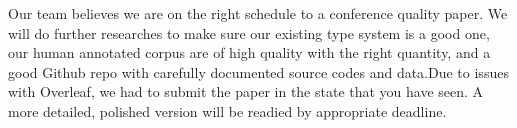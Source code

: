 \documentclass[conference]{IEEEtran}
\begin{document}
Our team believes we are on the right schedule to a conference quality paper. We will do further researches to make sure our existing type system is a good one, our human annotated corpus are of high quality with the right quantity, and a good Github repo with carefully documented source codes and data.Due to issues with Overleaf, we had to submit the paper in the state that you have seen. A more detailed, polished version will be readied by appropriate deadline.

%


%
%
\end{document}
